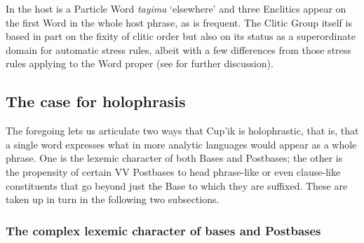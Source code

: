 \documentclass[output=paper]{langscibook}
\begin{document}
In  the host is a Particle Word \textit{tayima} `elsewhere' and three Enclitics appear on the first Word in the whole host phrase, as is frequent. The Clitic Group itself is based in part on the fixity of clitic order but also on its status as a superordinate domain for automatic stress rules, albeit with a few differences from those stress rules applying to the Word proper (see  for further discussion).

\subsection{The case for holophrasis} \label{sec:3.4}

The foregoing lets us articulate two ways that Cup'ik is holophrastic, that is, that a single word expresses what in more analytic languages would appear as a whole phrase. One is the lexemic character of both Bases and Postbases; the other is the propensity of certain VV Postbases to head phrase-like or even clause-like constituents that go beyond just the Base to which they are suffixed. These are taken up in turn in the following two subsections.

\subsubsection{The complex lexemic character of bases and Postbases} 
\label{sec:3.4.1}
\end{document}
